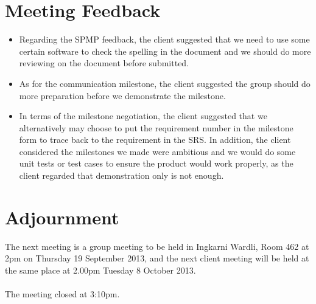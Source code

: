 \documentclass[12pt, a4paper]{article}
\begin{document}
\section{Meeting Feedback}
\begin{itemize}
 \item Regarding the SPMP feedback, the client suggested that we need to use some certain software to check the spelling in the document and we should do more reviewing on the document before submitted.
 
 \item As for the communication milestone, the client suggested the group should do more preparation before we demonstrate the milestone.
 
 \item In terms of the milestone negotiation, the client suggested that we alternatively may choose to put the requirement number in the milestone form to trace back to the requirement in the SRS. In addition, the client considered the milestones we made were ambitious and we would do some unit tests or test cases to ensure the product would work properly, as the client regarded that demonstration only is not enough.

\end{itemize}

\section{Adjournment}
The next meeting is a group meeting to be held in Ingkarni Wardli, Room 462 at 2pm on Thursday 19 September 2013, and the next client meeting will be held at the same place at 2.00pm Tuesday 8 October 2013.\\
\\
The meeting closed at 3:10pm.
\end{document}
